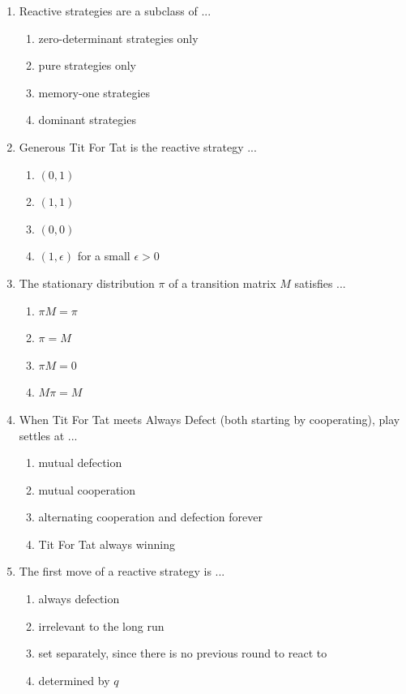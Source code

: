 \documentclass[11pt]{article}
\begin{document}
\begin{enumerate}[itemsep=6pt]
  \item Reactive strategies are a subclass of ...
  \begin{enumerate}
    \item zero-determinant strategies only
    \item pure strategies only
    \item memory-one strategies
    \item dominant strategies
  \end{enumerate}
  \item Generous Tit For Tat is the reactive strategy ...
  \begin{enumerate}
    \item \((0, 1)\)
    \item \((1, 1)\)
    \item \((0, 0)\)
    \item \((1, \epsilon)\) for a small \(\epsilon > 0\)
  \end{enumerate}
  \item The stationary distribution \(\pi\) of a transition matrix \(M\) satisfies ...
  \begin{enumerate}
    \item \(\pi M = \pi\)
    \item \(\pi = M\)
    \item \(\pi M = 0\)
    \item \(M \pi = M\)
  \end{enumerate}
  \item When Tit For Tat meets Always Defect (both starting by cooperating), play settles at ...
  \begin{enumerate}
    \item mutual defection
    \item mutual cooperation
    \item alternating cooperation and defection forever
    \item Tit For Tat always winning
  \end{enumerate}
  \item The first move of a reactive strategy is ...
  \begin{enumerate}
    \item always defection
    \item irrelevant to the long run
    \item set separately, since there is no previous round to react to
    \item determined by \(q\)
  \end{enumerate}

\end{enumerate}
\end{document}
